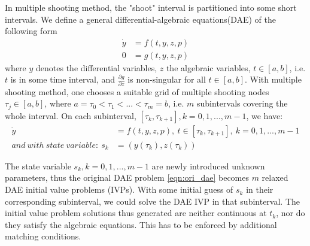 In multiple shooting method, the "shoot" interval is partitioned into some short intervals. We define a general differential-algebraic equations(DAE) of the following form
\begin{equation}\label{eqn:ori_dae}
	\begin{aligned}
		\dot{y} &= f(t, y, z, p) \\ 
		0 &= g(t, y, z, p)
	\end{aligned}
\end{equation}
where $y$ denotes the differential variables, $z$ the algebraic variables, $t \in [a, b]$, i.e. $t$ is in some time interval, and $\frac{\partial g}{\partial z}$ is non-singular for all $t \in [a, b]$. With multiple shooting method, one chooses a suitable grid of multiple shooting nodes $\tau_j \in [a,b] $, where $a = \tau_0 < \tau_1 < ... < \tau_m = b$,  i.e. $m$ subintervals covering the whole interval. On each subinterval, $[\tau_k, \tau_{k+1}], k = 0, 1, ..., m-1$,  we have: 
\begin{equation}\label{eqn:msh}
	\begin{aligned}
		\dot{y} &= f(t, y, z, p),\  t \in [\tau_k, \tau_{k+1}],\  k = 0, 1, ..., m-1 \\ 
		and \ with \ state \ variable:  \ s_k &= (y(\tau_k), z(\tau_k))   
	\end{aligned}
\end{equation}

The state variable $s_k, k = 0, 1, ..., m-1$ are newly introduced unknown parameters, thus the original DAE problem \ref{eqn:ori_dae} becomes $m$ relaxed DAE initial value problems (IVPs). With some initial guess of $s_k$ in their corresponding subinterval, we could solve the DAE IVP in that subinterval. The initial value problem solutions thus generated are neither continuous at $t_k$, nor do they satisfy the algebraic equations. This has to be enforced by additional matching conditions. 

